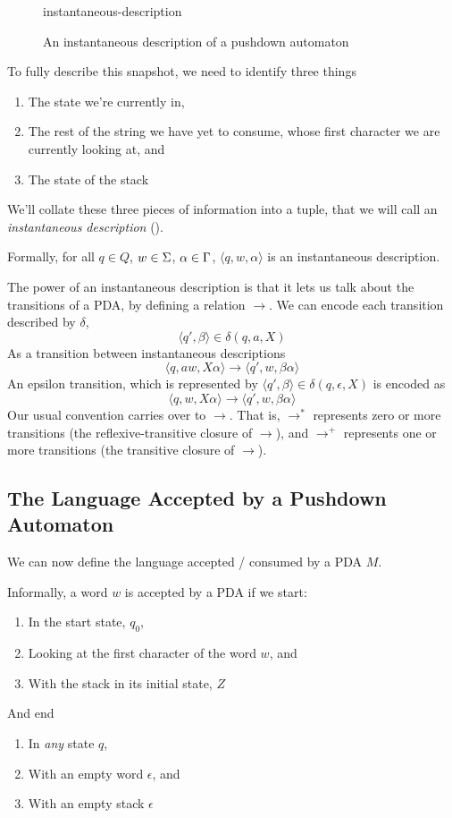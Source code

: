 \begin{figure}[H]
    \centering
    {instantaneous-description}
    \caption{An instantaneous description of a pushdown automaton}
    \label{figure:instantaneous-description}
\end{figure}

To fully describe this snapshot, we need to identify three things
\begin{enumerate}
    \item The state we're currently in,
    \item The rest of the string we have yet to consume, whose first character we are currently looking at, and
    \item The state of the stack
\end{enumerate}

We'll collate these three pieces of information into a tuple, that we will call an \textit{instantaneous description} ().

Formally, for all $q \in Q$, $w \in \Sigma\*$, $\alpha \in \Gamma\*$, $\langle q, w, \alpha \rangle$ is an instantaneous description.

The power of an instantaneous description is that it lets us talk about the transitions of a PDA, by defining a relation $\rightarrow$. We can encode each transition described by $\delta$,
\[\langle q', \beta \rangle \in \delta(q, a, X)\]
As a transition between instantaneous descriptions
\[\langle q, aw, X\alpha \rangle \rightarrow \langle q', w, \beta\alpha \rangle\]
An epsilon transition, which is represented by $\langle q', \beta \rangle \in \delta(q, \epsilon, X)$ is encoded as
\[\langle q, w, X\alpha \rangle \rightarrow \langle q', w, \beta\alpha \rangle\]
Our usual convention carries over to $\rightarrow$. That is, $\rightarrow^{*}$ represents zero or more transitions (the reflexive-transitive closure of $\rightarrow$), and $\rightarrow^{+}$ represents one or more transitions (the transitive closure of $\rightarrow$).

\subsection{The Language Accepted by a Pushdown Automaton}
We can now define the language accepted / consumed by a PDA $M$.

Informally, a word $w$ is accepted by a PDA if we start:
\begin{enumerate}
    \item In the start state, $q_0$,
    \item Looking at the first character of the word $w$, and
    \item With the stack in its initial state, $Z$
\end{enumerate}
And end 
\begin{enumerate}
    \item In \textit{any} state $q$,
    \item With an empty word $\epsilon$, and
    \item With an empty stack $\epsilon$
\end{enumerate}

